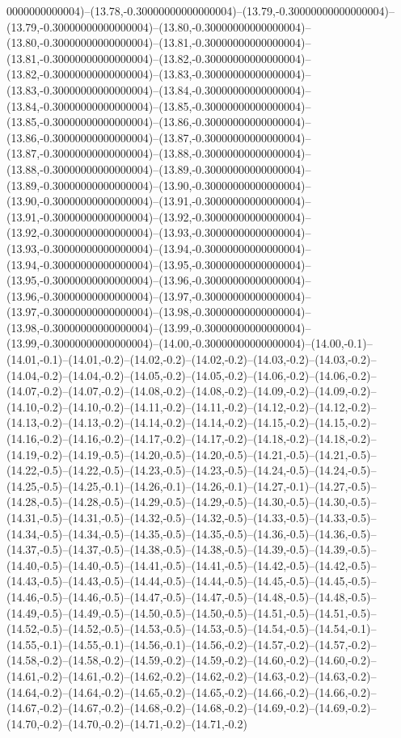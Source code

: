 0000000000004)--(13.78,-0.30000000000000004)--(13.79,-0.30000000000000004)--(13.79,-0.30000000000000004)--(13.80,-0.30000000000000004)--(13.80,-0.30000000000000004)--(13.81,-0.30000000000000004)--(13.81,-0.30000000000000004)--(13.82,-0.30000000000000004)--(13.82,-0.30000000000000004)--(13.83,-0.30000000000000004)--(13.83,-0.30000000000000004)--(13.84,-0.30000000000000004)--(13.84,-0.30000000000000004)--(13.85,-0.30000000000000004)--(13.85,-0.30000000000000004)--(13.86,-0.30000000000000004)--(13.86,-0.30000000000000004)--(13.87,-0.30000000000000004)--(13.87,-0.30000000000000004)--(13.88,-0.30000000000000004)--(13.88,-0.30000000000000004)--(13.89,-0.30000000000000004)--(13.89,-0.30000000000000004)--(13.90,-0.30000000000000004)--(13.90,-0.30000000000000004)--(13.91,-0.30000000000000004)--(13.91,-0.30000000000000004)--(13.92,-0.30000000000000004)--(13.92,-0.30000000000000004)--(13.93,-0.30000000000000004)--(13.93,-0.30000000000000004)--(13.94,-0.30000000000000004)--(13.94,-0.30000000000000004)--(13.95,-0.30000000000000004)--(13.95,-0.30000000000000004)--(13.96,-0.30000000000000004)--(13.96,-0.30000000000000004)--(13.97,-0.30000000000000004)--(13.97,-0.30000000000000004)--(13.98,-0.30000000000000004)--(13.98,-0.30000000000000004)--(13.99,-0.30000000000000004)--(13.99,-0.30000000000000004)--(14.00,-0.30000000000000004)--(14.00,-0.1)--(14.01,-0.1)--(14.01,-0.2)--(14.02,-0.2)--(14.02,-0.2)--(14.03,-0.2)--(14.03,-0.2)--(14.04,-0.2)--(14.04,-0.2)--(14.05,-0.2)--(14.05,-0.2)--(14.06,-0.2)--(14.06,-0.2)--(14.07,-0.2)--(14.07,-0.2)--(14.08,-0.2)--(14.08,-0.2)--(14.09,-0.2)--(14.09,-0.2)--(14.10,-0.2)--(14.10,-0.2)--(14.11,-0.2)--(14.11,-0.2)--(14.12,-0.2)--(14.12,-0.2)--(14.13,-0.2)--(14.13,-0.2)--(14.14,-0.2)--(14.14,-0.2)--(14.15,-0.2)--(14.15,-0.2)--(14.16,-0.2)--(14.16,-0.2)--(14.17,-0.2)--(14.17,-0.2)--(14.18,-0.2)--(14.18,-0.2)--(14.19,-0.2)--(14.19,-0.5)--(14.20,-0.5)--(14.20,-0.5)--(14.21,-0.5)--(14.21,-0.5)--(14.22,-0.5)--(14.22,-0.5)--(14.23,-0.5)--(14.23,-0.5)--(14.24,-0.5)--(14.24,-0.5)--(14.25,-0.5)--(14.25,-0.1)--(14.26,-0.1)--(14.26,-0.1)--(14.27,-0.1)--(14.27,-0.5)--(14.28,-0.5)--(14.28,-0.5)--(14.29,-0.5)--(14.29,-0.5)--(14.30,-0.5)--(14.30,-0.5)--(14.31,-0.5)--(14.31,-0.5)--(14.32,-0.5)--(14.32,-0.5)--(14.33,-0.5)--(14.33,-0.5)--(14.34,-0.5)--(14.34,-0.5)--(14.35,-0.5)--(14.35,-0.5)--(14.36,-0.5)--(14.36,-0.5)--(14.37,-0.5)--(14.37,-0.5)--(14.38,-0.5)--(14.38,-0.5)--(14.39,-0.5)--(14.39,-0.5)--(14.40,-0.5)--(14.40,-0.5)--(14.41,-0.5)--(14.41,-0.5)--(14.42,-0.5)--(14.42,-0.5)--(14.43,-0.5)--(14.43,-0.5)--(14.44,-0.5)--(14.44,-0.5)--(14.45,-0.5)--(14.45,-0.5)--(14.46,-0.5)--(14.46,-0.5)--(14.47,-0.5)--(14.47,-0.5)--(14.48,-0.5)--(14.48,-0.5)--(14.49,-0.5)--(14.49,-0.5)--(14.50,-0.5)--(14.50,-0.5)--(14.51,-0.5)--(14.51,-0.5)--(14.52,-0.5)--(14.52,-0.5)--(14.53,-0.5)--(14.53,-0.5)--(14.54,-0.5)--(14.54,-0.1)--(14.55,-0.1)--(14.55,-0.1)--(14.56,-0.1)--(14.56,-0.2)--(14.57,-0.2)--(14.57,-0.2)--(14.58,-0.2)--(14.58,-0.2)--(14.59,-0.2)--(14.59,-0.2)--(14.60,-0.2)--(14.60,-0.2)--(14.61,-0.2)--(14.61,-0.2)--(14.62,-0.2)--(14.62,-0.2)--(14.63,-0.2)--(14.63,-0.2)--(14.64,-0.2)--(14.64,-0.2)--(14.65,-0.2)--(14.65,-0.2)--(14.66,-0.2)--(14.66,-0.2)--(14.67,-0.2)--(14.67,-0.2)--(14.68,-0.2)--(14.68,-0.2)--(14.69,-0.2)--(14.69,-0.2)--(14.70,-0.2)--(14.70,-0.2)--(14.71,-0.2)--(14.71,-0.2)